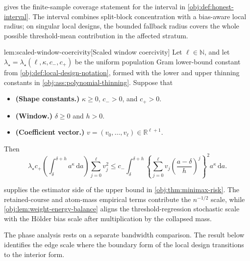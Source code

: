  gives the finite-sample coverage statement for the interval in \cref{obj:def:honest-interval}. The interval combines split-block concentration with a bias-aware local radius; on singular local designs, the bounded fallback radius covers the whole possible threshold-mean contribution in the affected stratum.

\begin{lemmav}{lem:scaled-window-coercivity}[Scaled window coercivity]
Let \(\ell\in\mathbb N\), and let \(\lambda_\star=\lambda_\star(\ell,\kappa,c_-,c_+)\) be the uniform population Gram lower-bound constant from \cref{obj:def:local-design-notation}, formed with the lower and upper thinning constants in \cref{obj:ass:polynomial-thinning}. Suppose that
\begin{itemize}
\item \textbf{(Shape constants.)} \(\kappa\ge 0\), \(c_->0\), and \(c_+>0\).
\item \textbf{(Window.)} \(\delta\ge 0\) and \(h>0\).
\item \textbf{(Coefficient vector.)} \(v=(v_0,\ldots,v_\ell)\in\mathbb R^{\ell+1}\).
\end{itemize}
Then
\[
\lambda_\star c_+
\left(\int_{\delta}^{\delta+h} a^\kappa\,\mathrm da\right)
\sum_{j=0}^{\ell} v_j^2
\le
c_-
\int_{\delta}^{\delta+h}
\left\{
\sum_{j=0}^{\ell}
v_j\left(\frac{a-\delta}{h}\right)^j
\right\}^2
a^\kappa\,\mathrm da .
\]
\end{lemmav}

 supplies the estimator side of the upper bound in \cref{obj:thm:minimax-risk}. The retained-course and atom-mass empirical terms contribute the \(n^{-1/2}\) scale, while \cref{obj:lem:weight-energy-balance} aligns the threshold-regression stochastic scale with the Hölder bias scale after multiplication by the collapsed mass.

The phase analysis rests on a separate bandwidth comparison. The result below identifies the edge scale where the boundary form of the local design transitions to the interior form.

